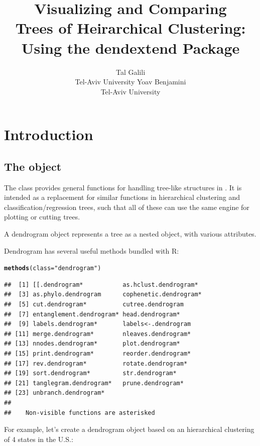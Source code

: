 \documentclass[shortnames,nojss,article]{jss}\usepackage[]{graphicx}\usepackage[]{color}
\title{Visualizing and Comparing\\ Trees of Heirarchical Clustering:\\ Using the dendextend \proglang{R} Package}
\author{Tal Galili\\Tel-Aviv University \And Yoav Benjamini\\Tel-Aviv University}
\makeatletter
\newcommand{\hlstr}[1]{\textcolor[rgb]{0.192,0.494,0.8}{#1}}%
\newcommand{\hlstd}[1]{\textcolor[rgb]{0.345,0.345,0.345}{#1}}%
\newcommand{\hlkwc}[1]{\textcolor[rgb]{0.333,0.667,0.333}{#1}}%
\newcommand{\hlkwd}[1]{\textcolor[rgb]{0.737,0.353,0.396}{\textbf{#1}}}%
\newenvironment{kframe}{%
 \def\at@end@of@kframe{}%
 \ifinner\ifhmode%
  \def\at@end@of@kframe{\end{minipage}}%
  \begin{minipage}{\columnwidth}%
 \fi\fi%
 \def\FrameCommand##1{\hskip\@totalleftmargin \hskip-\fboxsep
 \colorbox{shadecolor}{##1}\hskip-\fboxsep
     \hskip-\linewidth \hskip-\@totalleftmargin \hskip\columnwidth}%
 \MakeFramed {\advance\hsize-\width
   \@totalleftmargin\z@ \linewidth\hsize
   \@setminipage}}%
 {\par\unskip\endMakeFramed%
 \at@end@of@kframe}
\newenvironment{knitrout}{}{} %
\makeatother
\begin{document}
\vspace*{-0.25cm}



\section{Introduction}

\subsection{The  object}

The  class provides general functions for handling tree-like structures in  \citep{R:Main}. It is intended as a replacement for similar functions in hierarchical clustering and classification/regression trees, such that all of these can use the same engine for plotting or cutting trees.

A dendrogram object represents a tree as a nested  object, with various attributes.

Dendrogram has several useful methods bundled with R:

\begin{knitrout}
\color{fgcolor}\begin{kframe}
\begin{alltt}
\hlkwd{methods}\hlstd{(}\hlkwc{class} \hlstd{=} \hlstr{"dendrogram"}\hlstd{)}
\end{alltt}
\begin{verbatim}
##  [1] [[.dendrogram*           as.hclust.dendrogram*   
##  [3] as.phylo.dendrogram      cophenetic.dendrogram*  
##  [5] cut.dendrogram*          cutree.dendrogram       
##  [7] entanglement.dendrogram* head.dendrogram*        
##  [9] labels.dendrogram*       labels<-.dendrogram     
## [11] merge.dendrogram*        nleaves.dendrogram*     
## [13] nnodes.dendrogram*       plot.dendrogram*        
## [15] print.dendrogram*        reorder.dendrogram*     
## [17] rev.dendrogram*          rotate.dendrogram*      
## [19] sort.dendrogram*         str.dendrogram*         
## [21] tanglegram.dendrogram*   prune.dendrogram*        
## [23] unbranch.dendrogram*    
## 
##    Non-visible functions are asterisked
\end{verbatim}
\end{kframe}
\end{knitrout}


For example, let's create a dendrogram object based on an hierarchical clustering of 4 states in the U.S.:
\end{document}
